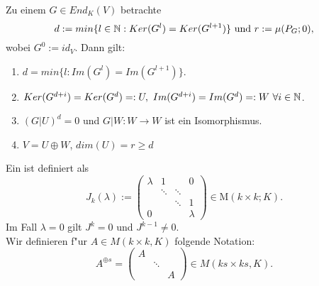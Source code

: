\documentclass[8pt, a4paper, twocolumn, landscape]{article}
\newcommand{\comment}[1]{}
\begin{document}
\begin{lemma}
 Zu einem $G \in End_K(V) $ betrachte
$$d := min \{ l \in \mathbb{N} : Ker (G^l) =Ker(G^{l + 1}) \} \text{ und } r := \mu (P_G ; 0),$$
wobei $G^0 := id_V$. Dann gilt:
\begin{enumerate}
\item $d =min \{l : Im(G^l) = Im(G^{l + 1}) \}.$
\item $Ker (G^{d + i}) = Ker (G^d) =: U, \ Im (G^{d + i}) = Im (G^d) =: W \ \forall i \in \mathbb{N}$.
\item $(G|U)^d = 0$ und $G|W: W \rightarrow W$ ist ein Isomorphismus.
\item $V = U \oplus W$, $dim(U) = r \geq d$ %
\comment{ \\ Insbesondere gibt es eine Basis $\mathcal{B}$ von $V$, so dass
\\ \centerline{$M_\mathcal{B}(G) =
\left(\begin{array}{ll}{N} & {0} 
\\ {0} & {C}\end{array}\right) 
$
mit  $N^d = 0$ und $C \in GL (n-r; K)$.} }
\end{enumerate}
\end{lemma}

\begin{definition}
Ein  ist definiert als $$J_{k}(\lambda):=\left(\begin{array}{cccc}
{\lambda} & {1} & {} & {0} 
\\ {} & {\ddots} & {\ddots} & {} 
\\ {} & {} & {\ddots} & {1} 
\\ {0} & {} & {} & {\lambda}\end{array}\right) \in \mathrm{M}(k \times k ; K).$$ Im Fall $\lambda = 0$ gilt  $J^k = 0$ und $J^{k-1} \neq 0$. \\
Wir definieren f"ur $A \in M(k \times k, K)$ folgende Notation:
$$
A^{\oplus s} = \left( \begin{array}{ccc} A & &  \\ & \ddots & \\ & & A \end{array} \right) \in M(ks \times ks, K).
$$
\end{definition}
\end{document}
